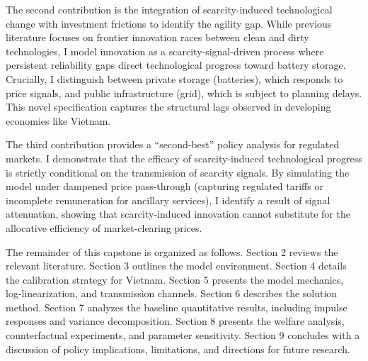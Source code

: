 \documentclass[12pt, a4paper]{article}
\begin{document}
	The second contribution is the integration of scarcity-induced technological change with investment frictions to identify the agility gap. While previous literature focuses on frontier innovation races between clean and dirty technologies, I model innovation as a scarcity-signal-driven process where persistent reliability gaps direct technological progress toward battery storage. Crucially, I distinguish between private storage (batteries), which responds to price signals, and public infrastructure (grid), which is subject to planning delays. This novel specification captures the structural lags observed in developing economies like Vietnam.
	
	The third contribution provides a ``second-best'' policy analysis for regulated markets. I demonstrate that the efficacy of scarcity-induced technological progress is strictly conditional on the transmission of scarcity signals. By simulating the model under dampened price pass-through (capturing regulated tariffs or incomplete remuneration for ancillary services), I identify a result of signal attenuation, showing that scarcity-induced innovation cannot substitute for the allocative efficiency of market-clearing prices.
	
	The remainder of this capstone is organized as follows. Section 2 reviews the relevant literature. Section 3 outlines the model environment. Section 4 details the calibration strategy for Vietnam. Section 5 presents the model mechanics, log-linearization, and transmission channels. Section 6 describes the solution method. Section 7 analyzes the baseline quantitative results, including impulse responses and variance decomposition. Section 8 presents the welfare analysis, counterfactual experiments, and parameter sensitivity. Section 9 concludes with a discussion of policy implications, limitations, and directions for future research.
	
\end{document}
